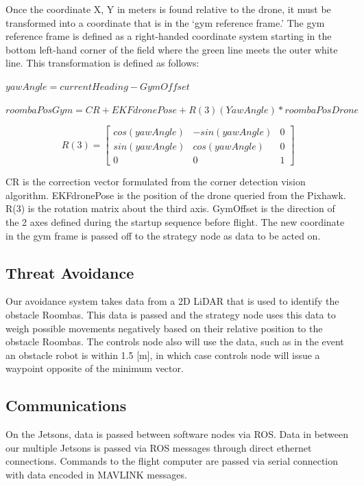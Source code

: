 \documentclass[12pt,letterpaper]{article}
\begin{document}
		Once the coordinate X, Y in meters is found relative to the drone, it must be transformed into a coordinate that is in the `gym reference frame.' The gym reference frame is defined as a right-handed coordinate system starting in the bottom left-hand corner of the field where the green line meets the outer white line. This transformation is defined as follows:

		\begin{center}
			$yawAngle = currentHeading - GymOffset$
		\end{center}
		\begin{center}
			$roombaPosGym = CR + EKFdronePose + R(3)(YawAngle)*roombaPosDrone$
		\end{center}

		\[
		R(3) =
			\begin{bmatrix}
			cos(yawAngle) & -sin(yawAngle) & 0 \\
			sin(yawAngle) & cos(yawAngle)  & 0 \\
			0 & 0 & 1
			\end{bmatrix}
		\]

		CR is the correction vector formulated from the corner detection vision algorithm. EKFdronePose is the position of the drone queried from the Pixhawk. R(3) is the rotation matrix about the third axis. GymOffset is the direction of the 2 axes defined during the startup sequence before flight. The new coordinate in the gym frame is passed off to the strategy node as data to be acted on.
	\subsection*{Threat Avoidance}
		Our avoidance system takes data from a 2D LiDAR that is used to identify the obstacle Roombas. This data is passed and the strategy node uses this data to weigh possible movements negatively based on their relative position to the obstacle Roombas. The controls node also will use the data, such as in the event an obstacle robot is within 1.5 [m], in which case controls node will issue a waypoint opposite of the minimum vector.

	\subsection*{Communications}
		On the Jetsons, data is passed between software nodes via ROS. Data in between our multiple Jetsons is passed via ROS messages through direct ethernet connections. Commands to the flight computer are passed via serial connection with data encoded in MAVLINK messages.
\end{document}
